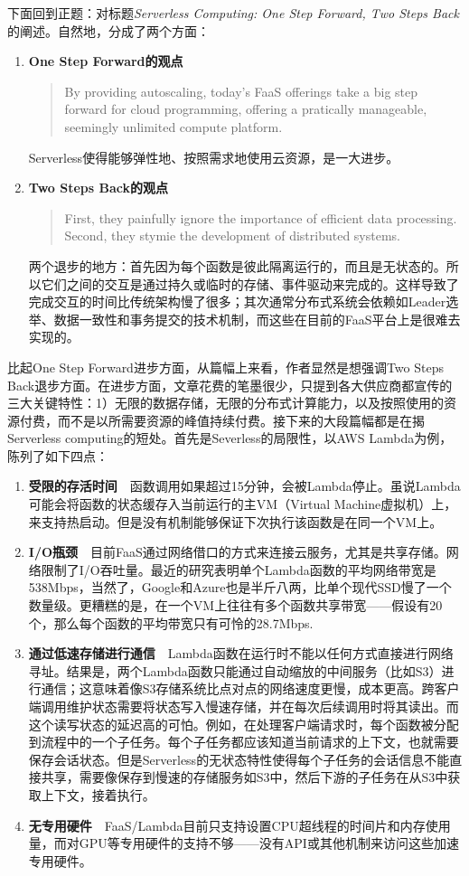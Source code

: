 \documentclass[11pt]{article}
\begin{document}
下面回到正题：对标题\textit{Serverless Computing: One Step Forward, Two Steps Back}的阐述。自然地，分成了两个方面：
\begin{enumerate}
	\item \textbf{One Step Forward的观点}\begin{quote}
		By providing autoscaling, today's FaaS offerings take a big step forward for cloud programming, offering a pratically manageable, seemingly unlimited compute platform.\cite{hellerstein2018serverless}
	\end{quote}
	Serverless使得能够弹性地、按照需求地使用云资源，是一大进步。
	\item \textbf{Two Steps Back的观点}\begin{quote}
		First, they painfully ignore the importance of efficient data processing. Second, they stymie the development of distributed systems.\cite{hellerstein2018serverless}
	\end{quote}
	两个退步的地方：首先因为每个函数是彼此隔离运行的，而且是无状态的。所以它们之间的交互是通过持久或临时的存储、事件驱动来完成的。这样导致了完成交互的时间比传统架构慢了很多；其次通常分布式系统会依赖如Leader选举、数据一致性和事务提交的技术机制，而这些在目前的FaaS平台上是很难去实现的。
\end{enumerate}
比起One Step Forward进步方面，从篇幅上来看，作者显然是想强调Two Steps Back退步方面。在进步方面，文章花费的笔墨很少，只提到各大供应商都宣传的三大关键特性：1）无限的数据存储，无限的分布式计算能力，以及按照使用的资源付费，而不是以所需要资源的峰值持续付费。接下来的大段篇幅都是在揭Serverless computing的短处。首先是Severless的局限性，以AWS Lambda为例，陈列了如下四点\cite{hellerstein2018serverless}：
\begin{enumerate}
	\item \textbf{受限的存活时间}\ \ 函数调用如果超过15分钟，会被Lambda停止。虽说Lambda可能会将函数的状态缓存入当前运行的主VM（Virtual Machine虚拟机）上，来支持热启动。但是没有机制能够保证下次执行该函数是在同一个VM上。
	\item \textbf{I/O瓶颈}\ \ 目前FaaS通过网络借口的方式来连接云服务，尤其是共享存储。网络限制了I/O吞吐量。最近的研究表明单个Lambda函数的平均网络带宽是538Mbps，当然了，Google和Azure也是半斤八两，比单个现代SSD慢了一个数量级。更糟糕的是，在一个VM上往往有多个函数共享带宽——假设有20个，那么每个函数的平均带宽只有可怜的28.7Mbps.
	\item \textbf{通过低速存储进行通信}\ \ Lambda函数在运行时不能以任何方式直接进行网络寻址。结果是，两个Lambda函数只能通过自动缩放的中间服务（比如S3）进行通信；这意味着像S3存储系统比点对点的网络速度更慢，成本更高。跨客户端调用维护状态需要将状态写入慢速存储，并在每次后续调用时将其读出。而这个读写状态的延迟高的可怕。例如，在处理客户端请求时，每个函数被分配到流程中的一个子任务。每个子任务都应该知道当前请求的上下文，也就需要保存会话状态。但是Serverless的无状态特性使得每个子任务的会话信息不能直接共享，需要像保存到慢速的存储服务如S3中，然后下游的子任务在从S3中获取上下文，接着执行。
	\item \textbf{无专用硬件}\ \ FaaS/Lambda目前只支持设置CPU超线程的时间片和内存使用量，而对GPU等专用硬件的支持不够——没有API或其他机制来访问这些加速专用硬件。
\end{enumerate}
\end{document}
